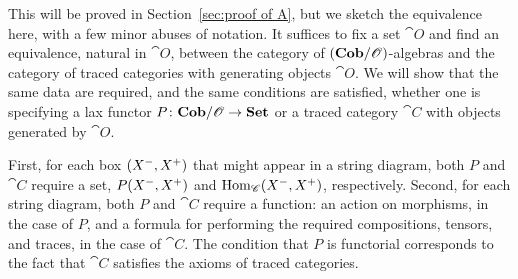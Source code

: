 \documentclass[12pt,oneside,article,draft]{memoir}
\begin{document}
This will be proved in Section~\ref{sec:proof of A}, but we sketch the equivalence here, with a few minor abuses of notation. It suffices to fix a set $\cat{O}$ and find an equivalence, natural in $\cat{O}$, between the category of $(\mathbf{Cob}/\mathscr{O})$-algebras and the category of traced categories with generating objects $\cat{O}$. We will show that the same data are required, and the same conditions are satisfied, whether one is specifying a lax functor $P\colon\mathbf{Cob}/\mathscr{O}\to\mathbf{Set}$ or a traced category $\cat{C}$ with objects generated by $\cat{O}$. 

First, for each box $(X^-,X^+)$ that might appear in a string diagram, both $P$ and $\cat{C}$ require a set, $P(X^-,X^+)$ and $\operatorname{Hom}_{\mathscr{C}}(X^-,X^+)$, respectively. Second, for each string diagram, both $P$ and $\cat{C}$ require a function: an action on morphisms, in the case of $P$, and a formula for performing the required compositions, tensors, and traces, in the case of $\cat{C}$. The condition that $P$ is functorial corresponds to the fact that $\cat{C}$ satisfies the axioms of traced categories. 
\end{document}
